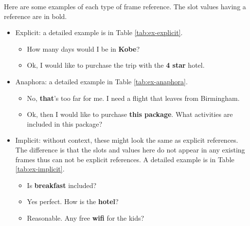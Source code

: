 Here are some examples of each type of frame reference. The slot values having a reference are in bold.
\begin{itemize}
    \item Explicit: a detailed example is in Table \ref{tab:ex-explicit}.
    \begin{itemize}
        \item How many days would I be in \textbf{Kobe}? %
        \item Ok, I would like to purchase the trip with the \textbf{4 star} hotel. %
    \end{itemize}

    \item Anaphora: a detailed example in Table \ref{tab:ex-anaphora}.
    \begin{itemize}
        \item No, \textbf{that}'s too far for me. I need a flight that leaves from Birmingham. %
        \item Ok, then I would like to purchase \textbf{this package}. What activities are included in this package? %
    \end{itemize}
    
    \item Implicit: without context, these might look the same as explicit references. The difference is that the slots and values here do not appear in any existing frames thus can not be explicit references. A detailed example is in Table \ref{tab:ex-implicit}.
    \begin{itemize}
        \item{
            Is \textbf{breakfast} included? %
        }
        \item{
            Yes perfect. How is the \textbf{hotel}? %
        }
        \item{
            Reasonable. Any free \textbf{wifi} for the kids? %
        }
    \end{itemize}
\end{itemize}

